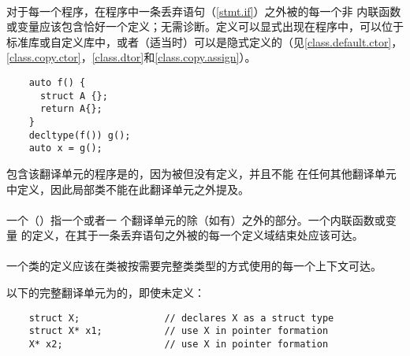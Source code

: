 \paragraph{} %
对于每一个程序，在程序中一条丢弃语句（\ref{stmt.if}）之外被\odrused{}的每一个非
内联函数或变量应该包含恰好一个定义；无需诊断。定义可以显式出现在程序中，可以位于
标准库或自定义库中，或者（适当时）可以是隐式定义的（见\ref{class.default.ctor}，
\ref{class.copy.ctor}，\ref{class.dtor}和\ref{class.copy.assign}）。

\begin{example} %
  \begin{lstlisting}
    auto f() {
      struct A {};
      return A{};
    }
    decltype(f()) g();
    auto x = g();
  \end{lstlisting}
  包含该翻译单元的程序是\illform{}的，因为被\odruse{}但没有定义，并且不能
  在任何其他翻译单元中定义，因此局部类不能在此翻译单元之外提及。
\end{example}

\paragraph{} %
一个（）指一个或者一
个翻译单元的除（如有）之外的部分。一个内联函数或变量
的定义，在其于一条丢弃语句之外被\odruse{}的每一个定义域结束处应该可达。

\paragraph{} %
一个类的定义应该在类被按需要完整类类型的方式使用的每一个上下文可达。

\begin{example} %
  以下的完整翻译单元为\wellform{}的，即使未定义：
  \begin{lstlisting}
    struct X;               // declares X as a struct type
    struct X* x1;           // use X in pointer formation
    X* x2;                  // use X in pointer formation
  \end{lstlisting}
\end{example}

